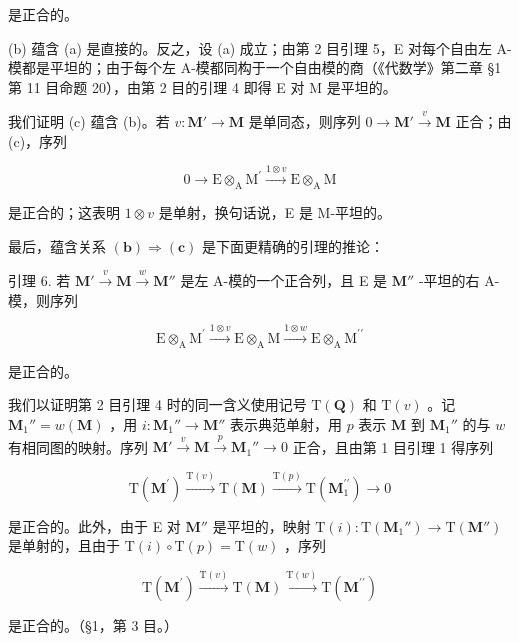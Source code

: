 是正合的。

(b) 蕴含 (a) 是直接的。反之，设 (a) 成立；由第 2 目引理 5，E 对每个自由左 A-模都是平坦的；由于每个左 A-模都同构于一个自由模的商（《代数学》第二章 §1 第 11 目命题 20），由第 2 目的引理 4 即得 E 对 M 是平坦的。

我们证明 (c) 蕴含 (b)。若 \(v \colon \mathbf{M}' \to \mathbf{M}\) 是单同态，则序列 \(0 \to \mathbf{M}' \xrightarrow{v} \mathbf{M}\) 正合；由 (c)，序列

\[
0 \rightarrow \mathrm{E} \otimes_ {\mathrm{A}} \mathrm{M} ^ {\prime} \xrightarrow {1 \otimes v} \mathrm{E} \otimes_ {\mathrm{A}} \mathrm{M}
\]

是正合的；这表明 \(1 \otimes v\) 是单射，换句话说，E 是 M-平坦的。

最后，蕴含关系 \((\mathbf{b}) \Rightarrow (\mathbf{c})\) 是下面更精确的引理的推论：

引理 6. 若 \(\mathbf{M}' \xrightarrow{v} \mathbf{M} \xrightarrow{w} \mathbf{M}''\) 是左 A-模的一个正合列，且 E 是 \(\mathbf{M}''\) -平坦的右 A-模，则序列

\[
\mathrm{E} \otimes_ {\mathrm{A}} \mathrm{M} ^ {\prime} \xrightarrow {1 \otimes v} \mathrm{E} \otimes_ {\mathrm{A}} \mathrm{M} \xrightarrow {1 \otimes w} \mathrm{E} \otimes_ {\mathrm{A}} \mathrm{M} ^ {\prime \prime}
\]

是正合的。

我们以证明第 2 目引理 4 时的同一含义使用记号 \(\mathrm{T}(\mathbf{Q})\) 和 \(\mathrm{T}(v)\) 。记 \(\mathbf{M}_1'' = w(\mathbf{M})\) ，用 \(i: \mathbf{M}_1'' \to \mathbf{M}''\) 表示典范单射，用 \(p\) 表示 \(\mathbf{M}\) 到 \(\mathbf{M}_1''\) 的与 \(w\) 有相同图的映射。序列 \(\mathbf{M}' \xrightarrow{v} \mathbf{M} \xrightarrow{p} \mathbf{M}_1'' \to 0\) 正合，且由第 1 目引理 1 得序列

\[
\mathrm{T} (\mathbf {M} ^ {\prime}) \xrightarrow {\mathrm{T} (v)} \mathrm{T} (\mathbf {M}) \xrightarrow {\mathrm{T} (p)} \mathrm{T} (\mathbf {M} _ {1} ^ {\prime \prime}) \longrightarrow 0
\]

是正合的。此外，由于 E 对 \(\mathbf{M}''\) 是平坦的，映射 \(\mathrm{T}(i): \mathrm{T}(\mathbf{M}_1'') \to \mathrm{T}(\mathbf{M}'')\) 是单射的，且由于 \(\mathrm{T}(i) \circ \mathrm{T}(p) = \mathrm{T}(w)\) ，序列

\[
\mathrm{T} (\mathbf {M} ^ {\prime}) \xrightarrow {\mathrm{T} (v)} \mathrm{T} (\mathbf {M}) \xrightarrow {\mathrm{T} (w)} \mathrm{T} (\mathbf {M} ^ {\prime \prime})
\]

是正合的。（§1，第 3 目。）

